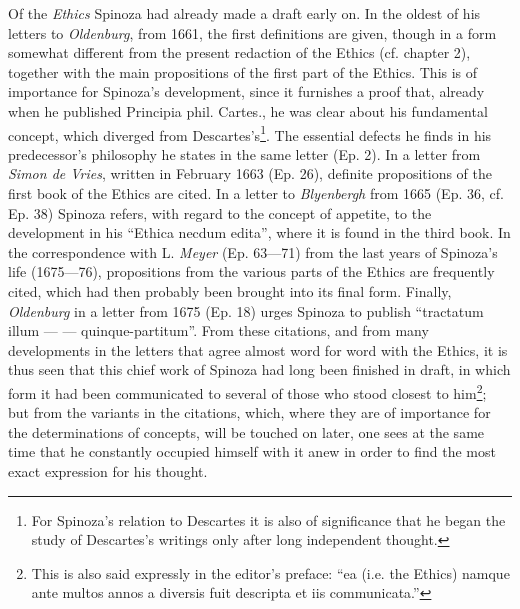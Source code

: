 \documentclass[12pt,a4paper,openany]{book}
\newcommand{\opage}[1]{\marginnote{\footnotesize\textit{[#1]}}}
\begin{document}
\opage{37}\setcounter{footnote}{0}Of the \emph{Ethics} Spinoza had already
made a draft early on. In the oldest of his letters to \emph{Oldenburg},
from 1661, the first definitions are given, though in a form somewhat
different from the present redaction of the Ethics (cf. chapter 2),
together with the main propositions of the first part of the Ethics. This
is of importance for Spinoza's development, since it furnishes a proof
that, already when he published Principia phil. Cartes., he was clear
about his fundamental concept, which diverged from Descartes's\footnote{For
Spinoza's relation to Descartes it is also of significance that he began
the study of Descartes's writings only after long independent thought.}.
The essential defects he finds in his predecessor's philosophy he states
in the same letter (Ep. 2). In a letter from \emph{Simon de Vries},
written in February 1663 (Ep. 26), definite propositions of the first
book of the Ethics are cited. In a letter to \emph{Blyenbergh} from 1665
(Ep. 36, cf. Ep. 38) Spinoza refers, with regard to the concept of
appetite, to the development in his ``Ethica necdum edita'', where it is
found in the third book. In the correspondence with L. \emph{Meyer} (Ep.
63---71) from the last years of Spinoza's life (1675---76), propositions
from the various parts of the Ethics are frequently cited, which had then
probably been brought into its final form. Finally, \emph{Oldenburg} in a
letter from 1675 (Ep. 18) urges Spinoza to publish ``tractatum illum ---
--- quinque-partitum''. From these citations, and from many developments
in the letters that agree almost word for word with the Ethics, it is
thus seen that this chief work of Spinoza had long been finished in
draft, in which form it had been communicated to several of those who
stood closest to him\footnote{This is also said expressly in the
editor's preface: ``ea (i.e. the Ethics) namque ante multos annos a
diversis fuit descripta et iis communicata.''}; but from the variants in
the citations, which, where they are of importance for the
determinations of concepts, will be touched on later, one sees at the
same time that he constantly occupied himself with it anew in order to
find the most exact expression for his thought.
\end{document}
